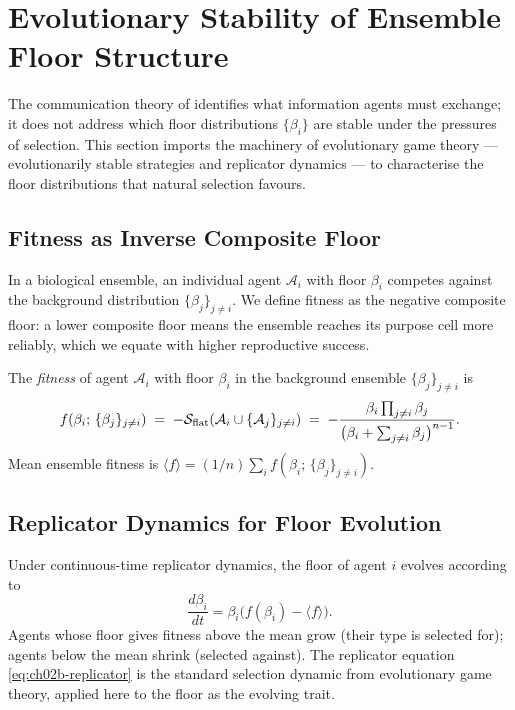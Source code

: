 \section{Evolutionary Stability of Ensemble Floor Structure}
\label{sec:ch02b-evolutionary-stability}

The communication theory of  identifies
what information agents must exchange; it does not address which floor
distributions $\{\beta_i\}$ are stable under the pressures of selection.  This
section imports the machinery of evolutionary game theory — evolutionarily
stable strategies and replicator dynamics — to characterise the floor
distributions that natural selection favours.

\subsection{Fitness as Inverse Composite Floor}

In a biological ensemble, an individual agent $\mathcal{A}_i$ with floor
$\beta_i$ competes against the background distribution $\{\beta_j\}_{j \neq i}$.
We define fitness as the negative composite floor: a lower composite floor
means the ensemble reaches its purpose cell more reliably, which we equate with
higher reproductive success.

\begin{definition}
\label{def:ch02b-fitness}
The \emph{fitness} of agent $\mathcal{A}_i$ with floor $\beta_i$ in the
background ensemble $\{\beta_j\}_{j \neq i}$ is
\begin{equation}
  f(\beta_i;\, \{\beta_j\}_{j \neq i})
  \;=\; -\mathcal{S}_{\mathrm{flat}}(\mathcal{A}_i \cup \{\mathcal{A}_j\}_{j \neq i})
  \;=\; -\frac{\beta_i \prod_{j \neq i} \beta_j}{\bigl(\beta_i + \sum_{j \neq i} \beta_j\bigr)^{n-1}}.
  \label{eq:ch02b-fitness}
\end{equation}
Mean ensemble fitness is
$\langle f \rangle = (1/n)\sum_i f(\beta_i;\, \{\beta_j\}_{j \neq i})$.
\end{definition}

\subsection{Replicator Dynamics for Floor Evolution}

Under continuous-time replicator dynamics, the floor of agent $i$ evolves
according to
\begin{equation}
  \frac{d\beta_i}{dt}
  = \beta_i \bigl(f(\beta_i) - \langle f \rangle\bigr).
  \label{eq:ch02b-replicator}
\end{equation}
Agents whose floor gives fitness above the mean grow (their type is selected
for); agents below the mean shrink (selected against).  The replicator equation
\eqref{eq:ch02b-replicator} is the standard selection dynamic from evolutionary
game theory, applied here to the floor as the evolving trait.


